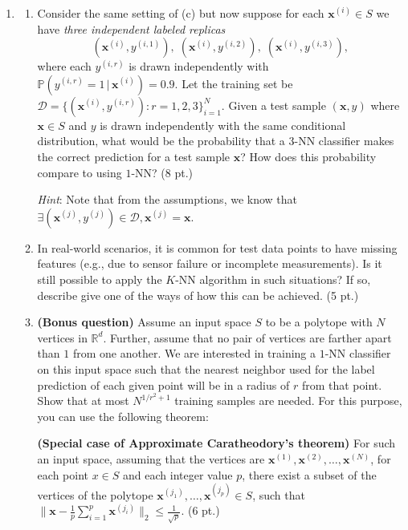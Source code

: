 \documentclass{article}
\newcommand{\bx}{{\boldsymbol x}}
\def\R{\mathbb{R}}
\theoremstyle{definition}
\theoremstyle{remark}
\newenvironment{Q}
        {%
          \clearpage
          \item
        }
        {%
          \phantom{s} 
          \bigskip
        }
\begin{document}
\begin{enumerate}[font={\Large\bfseries},left=0pt]
\begin{Q}
\begin{enumerate}
\item
Consider the same setting of (c) but 
now suppose for each \(\bx^{(i)}\in S\) we have \emph{three independent labeled replicas}
\[
(\bx^{(i)},y^{(i,1)}),\;(\bx^{(i)},y^{(i,2)}),\;(\bx^{(i)},y^{(i,3)}),
\]
where each \(y^{(i,r)}\) is drawn independently with
\(\mathbb{P}(y^{(i,r)}=1\,|\,\bx^{(i)})=0.9\).
Let the training set be
\(\mathcal D=\{(\bx^{(i)},y^{(i,r)}):  r=1,2,3\}_{i=1}^{N}\).
Given a test sample \((\bx,y)\) where \(\bx\in S\) and \(y\) is drawn independently with the same conditional distribution,
what would be the probability that a $3$-NN classifier makes the correct prediction for a test sample $\bx$? How does this probability compare to using $1$-NN? (8 pt.)

\textit{Hint}: Note that from the assumptions, we know that $\exists (\bx^{(j)}, y^{(j)}) \in \mathcal{D}, \bx^{(j)} = \bx$.
\item In real-world scenarios, it is common for test data points to have missing features (e.g., due to sensor failure or incomplete measurements). Is it still possible to apply the $K$-NN algorithm in such situations? If so, describe give one of the ways of how this can be achieved. (5 pt.)

\item \textbf{(Bonus question)} Assume an input space $S$ to be a polytope with $N$ vertices in $\R^d$. Further, assume that no pair of vertices are farther apart than $1$ from one another. We are interested in training a $1$-NN classifier on this input space such that the nearest neighbor used for the label prediction of each given point will be in a radius of $r$ from that point. Show that at most $N^{1/r^2 + 1}$ training samples are needed. For this purpose, you can use the following theorem:  

\textbf{(Special case of Approximate Caratheodory's theorem)} For such an input space, assuming that the vertices are $\bx^{(1)}, \bx^{(2)}, \dots, \bx^{(N)}$, for each point $x \in S$ and each integer value $p$, there exist a subset of the vertices of the polytope $\bx^{(j_1)},\dots,\bx^{(j_p)} \in S$, such that $ \| \bx- \frac{1}{p} \sum_{i=1}^p \bx^{(j_i)}\|_2 \leq \frac{1}{\sqrt{p}}$. (6 pt.)

\end{enumerate}
\end{Q}


\end{enumerate}
\end{document}
